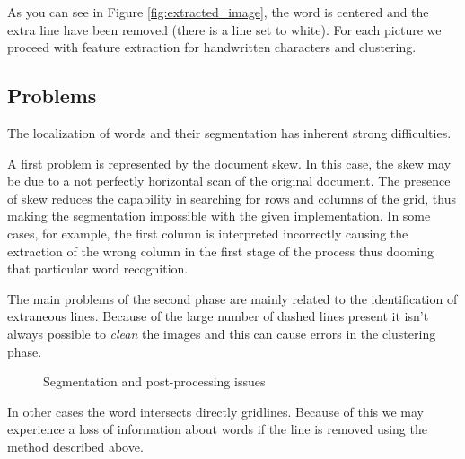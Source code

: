 As you can see in Figure \ref{fig:extracted_image}, the word is centered and the extra line have been removed (there is a line set to white). For each picture we proceed with feature extraction for handwritten characters and clustering. 

\subsection{Problems}

The localization of words and their segmentation has inherent strong difficulties.

A first problem is represented by the document skew. In this case, the skew may be due to a not perfectly horizontal scan of the original document. The presence of skew reduces the capability in searching for rows and columns of the grid, thus making the segmentation impossible with the given implementation. In some cases, for example, the first column is interpreted incorrectly causing the extraction of the wrong column in the first stage of the process thus dooming that particular word recognition.

The main problems of the second phase are mainly related to the identification of extraneous lines. Because of the large number of dashed lines present it isn't always possible to \emph{clean} the images and this can cause errors in the clustering phase.

\begin{figure}[!ht]
 \centering
 \hspace{5mm}
 \caption{Segmentation and post-processing issues}
 \end{figure}

In other cases the word intersects directly gridlines. Because of this we may experience a loss of information about words if the line is removed using the method described above.

